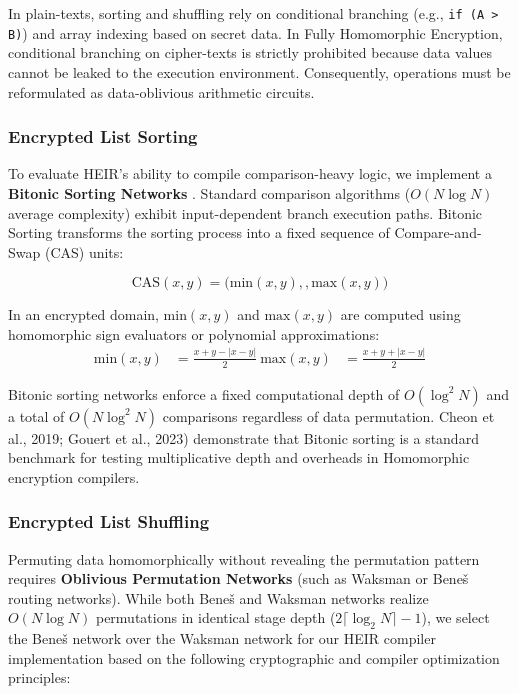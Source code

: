 \newpage

In plain-texts, sorting and shuffling rely on conditional branching (e.g., \texttt{if (A > B)}) and array indexing based on secret data. In Fully Homomorphic Encryption, conditional branching on cipher-texts is strictly prohibited because data values cannot be leaked to the execution environment. Consequently, operations must be reformulated as data-oblivious arithmetic circuits. 

\subsubsection{Encrypted List Sorting}
To evaluate HEIR's ability to compile comparison-heavy logic, we implement a \textbf{Bitonic Sorting Networks} \cite{1993icpp....1...23L}. Standard comparison algorithms ($O(N \log N)$ average complexity) exhibit input-dependent branch execution paths. Bitonic Sorting transforms the sorting process into a fixed sequence of Compare-and-Swap (CAS) units:

\begin{equation}
\text{CAS}(x, y) = \Big( \text{min}(x,y),, \text{max}(x,y) \Big)
\end{equation}

In an encrypted domain, $\text{min}(x,y)$ and $\text{max}(x,y)$ are computed using homomorphic sign evaluators or polynomial approximations:
\begin{align}
\text{min}(x, y) &= \frac{x + y - |x - y|}{2} \
\text{max}(x, y) &= \frac{x + y + |x - y|}{2}
\end{align}

Bitonic sorting networks enforce a fixed computational depth of $O(\log^2 N)$ and a total of $O(N \log^2 N)$ comparisons regardless of data permutation. Cheon et al., 2019; Gouert et al., 2023) demonstrate that Bitonic sorting is a standard benchmark for testing multiplicative depth and  overheads in Homomorphic encryption compilers.

\subsubsection{Encrypted List Shuffling}
Permuting data homomorphically without revealing the permutation pattern requires \textbf{Oblivious Permutation Networks} (such as Waksman or Bene\v{s} routing networks). While both Bene\v{s} and Waksman networks realize $O(N \log N)$ permutations in identical stage depth ($2\lceil \log_2 N \rceil - 1$), we  select the Bene\v{s} network over the Waksman network for our HEIR compiler implementation based on the following cryptographic and compiler optimization principles:

